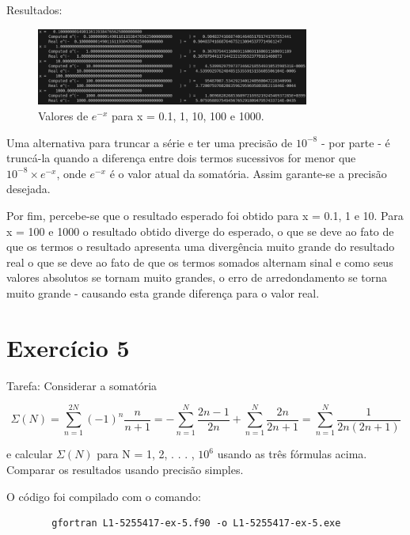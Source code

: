\documentclass[12pt, a4paper]{article} %
\begin{document}
    Resultados:
    \begin{figure}[H]
        \centering
        \includegraphics[width=0.8\textwidth]{../images/results-ex4.png}
        \caption{Valores de $e^{-x}$ para x = 0.1, 1, 10, 100 e 1000.}
    \end{figure}

    Uma alternativa para truncar a s\'erie e ter uma precis\~ao de $10^{-8}$ - por parte - \'e trunc\'a-la quando a diferen\c{c}a entre dois termos sucessivos for menor que $10^{-8} \times e^{-x}$, onde $e^{-x}$ \'e o valor atual da somat\'oria. Assim garante-se a precis\~ao desejada.

    Por fim, percebe-se que o resultado esperado foi obtido para x = 0.1, 1 e 10. Para x = 100 e 1000 o resultado obtido diverge do esperado, o que se deve ao fato de que os termos o resultado apresenta uma diverg\^encia muito grande do resultado real o que se deve ao fato de que os termos somados alternam sinal e como seus valores absolutos se tornam muito grandes, o erro de arredondamento se torna muito grande - causando esta grande diferen\c{c}a para o valor real.

\section{Exerc\'icio 5}

    Tarefa: Considerar a somat\'oria

    \begin{equation} \Sigma (N) = \sum_{n=1}^{2N} (-1)^n\frac{n}{n+1} = - \sum_{n=1}^N \frac{2n-1}{2n} + \sum_{n=1}^N \frac{2n}{2n+1} = \sum_{n=1}^N \frac{1}{2n(2n+1)} \end{equation}

    e calcular $\Sigma (N)$ para N = 1, 2, . . . , $10^6$ usando as tr\^es f\'ormulas acima. Comparar os resultados usando precis\~ao simples.


    O c\'odigo foi compilado com o comando:
    \begin{verbatim}
        gfortran L1-5255417-ex-5.f90 -o L1-5255417-ex-5.exe
    \end{verbatim}
\end{document}

